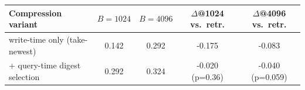 \begin{tabular}{lcccc}
\toprule
Compression variant & $B{=}1024$ & $B{=}4096$ & $\Delta$@1024 vs.\ retr. & $\Delta$@4096 vs.\ retr. \\
\midrule
write-time only (take-newest) & 0.142 & 0.292 & -0.175 & -0.083\\
+ query-time digest selection & 0.292 & 0.324 & -0.020 (p=0.36) & -0.040 (p=0.059)\\
\bottomrule
\end{tabular}